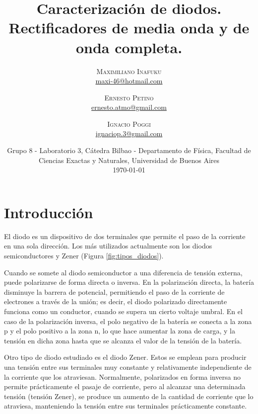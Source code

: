 \documentclass[twoside,twocolumn,a4paper]{article}
\title{Caracterizaci\'on de diodos. Rectificadores de media onda y de onda completa.} %
\author{%
\textsc{Maximiliano Inafuku} \\[1ex] %
\normalsize \href{mailto:maxi-46@hotmail.com}{maxi-46@hotmail.com} %
\and %
\textsc{Ernesto Petino} \\[1ex] %
\normalsize \href{mailto:ernesto.atmo@gmail.com}{ernesto.atmo@gmail.com} %
\and %
\textsc{Ignacio Poggi} \\[1ex] %
\normalsize \href{mailto:ignaciop.3@gmail.com}{ignaciop.3@gmail.com} %
}
\date{Grupo 8 - Laboratorio 3, C\'atedra Bilbao - Departamento de F\'isica, Facultad de Ciencias Exactas y Naturales, Universidad de Buenos Aires \newline \\ \today} %
\begin{document}
\maketitle



\section{Introducci\'on \cite{intro}} 

El diodo es un dispositivo de dos terminales que permite el paso de la corriente en una sola direcci\'on. Los m\'as utilizados actualmente son los diodos semiconductores y Zener (Figura \ref{fig:tipos_diodos}).\par

Cuando se somete al diodo semiconductor a una diferencia de tensi\'on externa, puede polarizarse de forma directa o inversa. En la polarizaci\'on directa, la bater\'ia disminuye la barrera de potencial, permitiendo el paso de la corriente de electrones a trav\'es de la uni\'on; es decir, el diodo polarizado directamente funciona como un conductor, cuando se supera un cierto voltaje umbral. En el caso de la polarizaci\'on inversa, el polo negativo de la bater\'ia se conecta a la zona p y el polo positivo a la zona n, lo que hace aumentar la zona de carga, y la tensi\'on en dicha zona hasta que se alcanza el valor de la tensi\'on de la bater\'ia. \par

Otro tipo de diodo estudiado es el diodo Zener. Estos se emplean para producir una tensi\'on entre sus terminales muy constante y relativamente independiente de la corriente que los atraviesan. Normalmente, polarizados en forma inversa no permite pr\'acticamente el pasaje de corriente, pero al alcanzar una determinada tensi\'on (tensi\'on Zener), se produce un aumento de la cantidad de corriente que lo atraviesa, manteniendo la tensi\'on entre sus terminales pr\'acticamente constante. 
\end{document}
